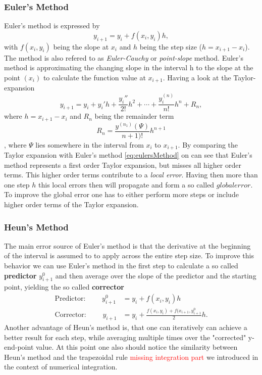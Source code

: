 \subsubsection{Euler's Method}
Euler's method is expressed by
\begin{equation}
	\label{eq:eulersMethod}
	y_{i+1} = y_i + f(x_i, y_i) h,
\end{equation}
with $f(x_i, y_i)$ being the slope at $x_i$ and $h$ being the step size ($h=x_{i+1} - x_{i}$). The method is also refered to as \textit{Euler-Cauchy} or \textit{point-slope} method. Euler's method is approximating the changing slope in the interval h to the slope at the point $(x_i)$ to calculate the function value at $x_{i+1}$. 
Having a look at the Taylor-expansion
\begin{equation}
	y_{i+1} = y_i + y_i' h + \frac{y_i''}{2!} h^2 + \cdots + \frac{y_i^{(n)}}{n!} h^n + R_n,
\end{equation}
where $h=x_{i+1}-x_i$ and $R_n$ being the remainder term
\begin{equation}
	R_n = \frac{y^{(n_1)}(\Psi)}{n+1)!} h^{n+1}
\end{equation},
where $\Psi$ lies somewhere in the interval from $x_i$ to $x_{i+1}$. By comparing the Taylor expansion with Euler's method \eqref{eq:eulersMethod} on can see that Euler's method represents a first order Taylor expansion, but misses all higher order terms. This higher order terms contribute to a \textit{local error}. Having then more than one step $h$ this local errors then will propagate and form a so called $global error$. To improve the global error one has to either perform more steps or include higher order terms of the Taylor expansion.

\subsubsection{Heun's Method}
The main error source of Euler's method is that the derivative at the beginning of the interval is assumed to to apply across the entire step size. To improve this behavior we can use Euler's method in the first step to calculate a so called \textbf{predictor} $y^0_{i+1}$ and then average over the slope of the predictor and the starting point, yielding the so called \textbf{corrector}
\begin{align}
	\text{Predictor: } \qquad y_{i+1}^0 &= y_i + f(x_i,y_i) h \\
	\text{Corrector: } \qquad y_{i+1} &= y_i + \frac{f(x_i, y_i) + f(x_{i+1}, y_{i+1}^0}{2} h.
\end{align}
Another advantage of Heun's method is, that one can iteratively can achieve a better result for each step, while averaging multiple times over the "corrected" y-end-point value. At this point one also should notice the similarity between Heun's method and the trapezoidal rule \textcolor{red}{missing integration part} we introduced in the context of numerical integration.

